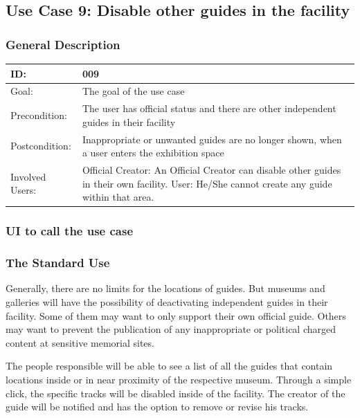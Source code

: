 \documentclass[12pt]{article}
\theoremstyle{definition}
\newenvironment{text}{
   \setlength{\parindent}{0pt}
   \color{black}
}{}
\begin{document}
\subsection{Use Case 9: Disable other guides in the facility}
\label{sec:disableguides}
    \subsubsection{General Description}
    
    \begin{tabular}{|p{.2\linewidth}|p{.65\linewidth}|}
    \hline 
    ID: & 009 \\ \hline
    Goal: & The goal of the use case \\ \hline
    Precondition: & The user has official status and there are other independent guides in their facility \\ \hline
    Postcondition: & Inappropriate or unwanted guides are no longer shown, when a user enters the exhibition space \\ \hline
    Involved Users: & Official Creator: An Official Creator can disable other guides in their own facility. \newline
    User: He/She cannot create any guide within that area.\\ \hline
    \end{tabular}
    
    \subsubsection{UI to call the use case}

    
    \subsubsection{The Standard Use}
    \begin{text}
    Generally, there are no limits for the locations of guides. But museums and galleries will have the possibility of deactivating independent guides in their facility. Some of them may want to only support their own official guide. Others may want to prevent the publication of any inappropriate or political charged content at sensitive memorial sites.
    
    The people responsible will be able to see a list of all the guides that contain locations inside or in near proximity of the respective museum. Through a simple click, the specific tracks will be disabled inside of the facility. The creator of the guide will be notified and has the option to remove or revise his tracks.
    
    \end{text}
    
\end{document}
